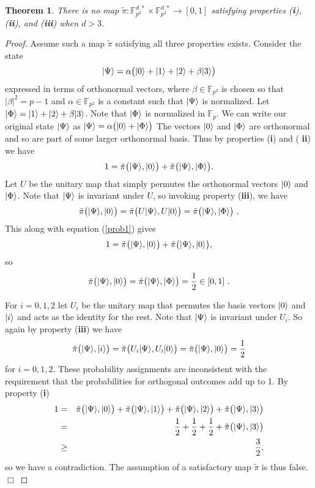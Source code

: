 \documentclass[english,12pt]{iopart}
\newcommand{\ff}[1]{\mathbb{F}_{#1}}
\newcommand{\ffzd}[1]{{\mathbb{F}^{d\;*}_{#1}}}
\newtheorem{theorem}{Theorem}
\newcommand{\dpt}{{\tilde{\pi}}}
\begin{document}
\begin{theorem}
\label{theorem1}
There is no map $\dpt\colon \ffzd{p^2}\times \ffzd{p^2}
\longrightarrow [0,1]$ satisfying properties ({\bf i}), ({\bf ii}),
and ({\bf iii}) when $d> 3$.
\end{theorem}
%
\begin{proof}
  Assume such a map $\dpt$ satisfying all three properties exists.
  Consider the state
\[
{\left\vert{\Psi}\right\rangle}=\alpha\big({\left\vert{0}\right\rangle} + {\left\vert{1}\right\rangle} + {\left\vert{2}\right\rangle} + \beta{\left\vert{3}\right\rangle}\big)
\]
expressed in terms of orthonormal vectors, where $\beta\in \ff{p^2}$
is chosen so that $\left|\beta\right|^2=p-1$ and $\alpha\in\ff{p^2}$
is a constant such that ${\left\vert{\Psi}\right\rangle}$ is normalized.  Let
${\left\vert{\Phi}\right\rangle}= {\left\vert{1}\right\rangle} + {\left\vert{2}\right\rangle} + \beta{\left\vert{3}\right\rangle}$. Note that ${\left\vert{\Phi}\right\rangle}$
is normalized in $\ff{p}$.  We can write our original state
${\left\vert{\Psi}\right\rangle}$ as ${\left\vert{\Psi}\right\rangle}=\alpha\big({\left\vert{0}\right\rangle}+{\left\vert{\Phi}\right\rangle}\big)$ The
vectors ${\left\vert{0}\right\rangle}$ and ${\left\vert{\Phi}\right\rangle}$ are orthonormal and so are part of
some larger orthonormal basis. Thus by properties ({\bf i}) and ({\bf
  ii}) we have
\begin{equation}
1= \dpt\big(\ket{\Psi},\ket{0}\big) +  \dpt\big(\ket{\Psi},\ket{\Phi}\big). \label{prob1}
\end{equation}
Let $U$ be the unitary map that simply permutes the orthonormal
vectors ${\left\vert{0}\right\rangle}$ and ${\left\vert{\Phi}\right\rangle}$.  Note that ${\left\vert{\Psi}\right\rangle}$ is
invariant under $U$, so invoking property ({\bf iii}), we have
\[
\dpt\big(\ket{\Psi},\ket{0}\big)=\dpt\big(U\ket{\Psi},U\ket{0}\big) = 
   \dpt\big(\ket{\Psi},\ket{\Phi}\big) \ .
\]
This along with equation (\ref{prob1}) gives
\[
1= \dpt\big(\ket{\Psi},\ket{0}\big) +  \dpt\big(\ket{\Psi},\ket{0}\big),
\]
so
\begin{equation}
\label{prob2}
\dpt\big(\ket{\Psi},\ket{0}\big)=\dpt\big(\ket{\Psi},
   \ket{\Phi}\big)=\frac{1}{2} \in [0,1] \ .
\end{equation}

For $i=0,1,2$ let $U_i$ be the unitary map that permutes the basis
vectors ${\left\vert{0}\right\rangle}$ and ${\left\vert{i}\right\rangle}$ and acts as the identity for the rest.
Note that ${\left\vert{\Psi}\right\rangle}$ is invariant under $U_i$. So again by property
({\bf iii}) we have
\[
\dpt\big(\ket{\Psi},\ket{i}\big) =\dpt\big(U_i\ket{\Psi},U_i\ket{0}\big)=
\dpt\big(\ket{\Psi},\ket{0}\big) = \frac{1}{2}
\]
for $i=0,1,2$.  These probability assignments are inconsistent with
the requirement that the probabilities for orthogonal outcomes add up
to 1. By property ({\bf i})
\begin{eqnarray*}
1 & = & \dpt\big(\ket{\Psi},\ket{0}\big)+\dpt\big(\ket{\Psi},\ket{1}\big)+\dpt\big(\ket{\Psi},\ket{2}\big)+\dpt\big(\ket{\Psi},\ket{3}\big)\\
 & = & \frac{1}{2}+\frac{1}{2}+\frac{1}{2}+\dpt\big(\ket{\Psi},\ket{3}\big)\\
 & \geq & \frac{3}{2},
\end{eqnarray*}
so we have a contradiction. The assumption of a satisfactory map
$\dpt$ is thus false. $\Box$
\end{proof}
\end{document}
